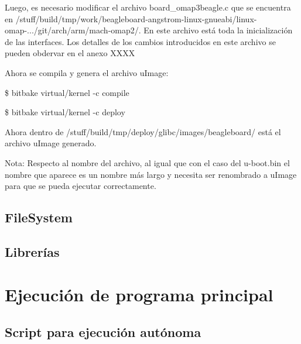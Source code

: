 Luego, es necesario modificar el archivo board\_omap3beagle.c que se encuentra en /stuff/build/tmp/work/beagleboard-angstrom-linux-gnueabi/linux-omap-.../git/arch/arm/mach-omap2/. En este archivo está toda la inicialización de las interfaces. Los detalles de los cambios introducidos en este archivo se pueden obdervar en el anexo XXXX

Ahora se compila y genera el archivo uImage:

\$ bitbake virtual/kernel -c compile 

\$ bitbake virtual/kernel -c deploy 

Ahora dentro de /stuff/build/tmp/deploy/glibc/images/beagleboard/ está el archivo uImage generado.

Nota: Respecto al nombre del archivo, al igual que con el caso del u-boot.bin el nombre que aparece es un nombre más largo y necesita ser renombrado a uImage para que se pueda ejecutar correctamente.


\subsection{FileSystem}
\subsection{Librerías}

\section{Ejecución de programa principal}
\subsection{Script para ejecución autónoma}
